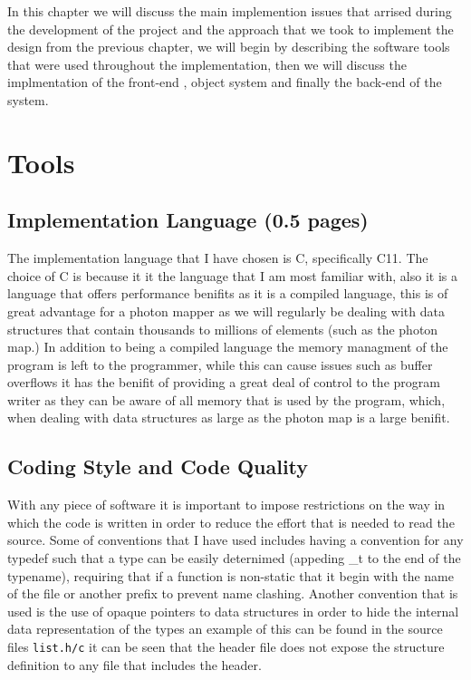 In this chapter we will discuss the main implemention issues that arrised during the development of the project
and the approach that we took to implement the design from the previous chapter, we will begin by describing the
software tools that were used throughout the implementation, then we will discuss the implmentation of the front-end
, object system and finally the back-end of the system.

\section{Tools} 
\subsection{Implementation Language (0.5 pages)}
The implementation language that I have chosen is C, specifically C11. The choice of C is because it it the
language that I am most familiar with, also it is a language that offers performance benifits as it is a compiled
language, this is of great advantage for a photon mapper as we will regularly be dealing with data structures
that contain thousands to millions of elements (such as the photon map.) In addition to being a compiled language
the memory managment of the program is left to the programmer, while this can cause issues such as buffer overflows
it has the benifit of providing a great deal of control to the program writer as they can be aware of all memory
that is used by the program, which, when dealing with data structures as large as the photon map is a large benifit.

\subsection{Coding Style and Code Quality}
With any piece of software it is important to impose restrictions on the way in which the code is written in order
to reduce the effort that is needed to read the source. Some of conventions that I have used includes having a
convention for any typedef such that a type can be easily deternimed (appeding \_t to the end of the typename),
requiring that if a function is non-static that it begin with the name of the file or another prefix to prevent
name clashing. Another convention that is used is the use of opaque pointers \cite{opaque-pointers} to data structures in order to
hide the internal data representation of the types an example of this can be found in the source files \texttt{list.h/c}
it can be seen that the header file does not expose the structure definition to any file that includes the header.

